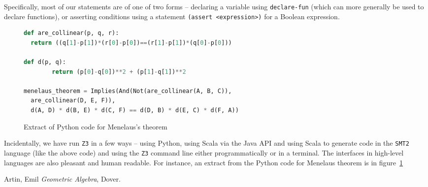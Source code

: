 \documentclass{amsart}
\theoremstyle{plain}
\theoremstyle{definition}
\theoremstyle{remark}
\begin{document}
Specifically, most of our statements are of one of two forms --
declaring a variable using \texttt{declare-fun} (which can more
generally be used to declare functions), or asserting conditions using a
statement \texttt{(assert\ <expression>)} for a
Boolean expression.

{\small
\begin{figure}
	\begin{lstlisting}[language=Python, frame=single]
def are_collinear(p, q, r):
  return ((q[1]-p[1])*(r[0]-p[0])==(r[1]-p[1])*(q[0]-p[0]))

def d(p, q):
        return (p[0]-q[0])**2 + (p[1]-q[1])**2

menelaus_theorem = Implies(And(Not(are_collinear(A, B, C)), 
  are_collinear(D, E, F)), 
  d(A, D) * d(B, E) * d(C, F) == d(D, B) * d(E, C) * d(F, A))
\end{lstlisting}
	\caption{Extract of Python code for Menelaus's theorem}\label{python-menelaus}
\end{figure}
}

Incidentally, we have run \texttt{Z3} in a few ways -- using Python, using Scala
via the Java API and using Scala to generate code in the \texttt{SMT2} language
(like the above code) and using the \texttt{Z3} command line either
programmatically or in a terminal. The interfaces in high-level
languages are also pleasant and human readable. For instance, an extract
from the Python code for Menelaus theorem is in figure~\ref{python-menelaus}



\begin{thebibliography}{10}

	 Artin, Emil
	\textit{Geometric Algebra},
	Dover.

\end{thebibliography} 
\end{document}
